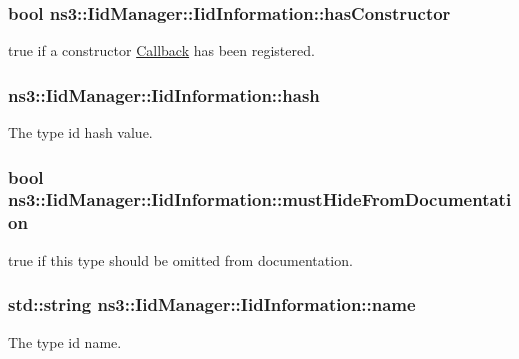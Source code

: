 \subsubsection[{\texorpdfstring{has\+Constructor}{hasConstructor}}]{\setlength{\rightskip}{0pt plus 5cm}bool ns3\+::\+Iid\+Manager\+::\+Iid\+Information\+::has\+Constructor}\hypertarget{structns3_1_1IidManager_1_1IidInformation_a9ee269731a2532bde60cf37ecac0ee18}{}\label{structns3_1_1IidManager_1_1IidInformation_a9ee269731a2532bde60cf37ecac0ee18}
{\ttfamily true} if a constructor \hyperlink{classns3_1_1Callback}{Callback} has been registered. 
\subsubsection[{\texorpdfstring{hash}{hash}}]{ ns3\+::\+Iid\+Manager\+::\+Iid\+Information\+::hash}\hypertarget{structns3_1_1IidManager_1_1IidInformation_abe6c59d16cffb91fc703d35a187eed1e}{}\label{structns3_1_1IidManager_1_1IidInformation_abe6c59d16cffb91fc703d35a187eed1e}
The type id hash value. 
\subsubsection[{\texorpdfstring{must\+Hide\+From\+Documentation}{mustHideFromDocumentation}}]{\setlength{\rightskip}{0pt plus 5cm}bool ns3\+::\+Iid\+Manager\+::\+Iid\+Information\+::must\+Hide\+From\+Documentation}\hypertarget{structns3_1_1IidManager_1_1IidInformation_aab1c6a5e3b78ce2fb5da67c24cb7106f}{}\label{structns3_1_1IidManager_1_1IidInformation_aab1c6a5e3b78ce2fb5da67c24cb7106f}
{\ttfamily true} if this type should be omitted from documentation. 
\subsubsection[{\texorpdfstring{name}{name}}]{\setlength{\rightskip}{0pt plus 5cm}std\+::string ns3\+::\+Iid\+Manager\+::\+Iid\+Information\+::name}\hypertarget{structns3_1_1IidManager_1_1IidInformation_a93b31c1c5e8326dffa684bbfc516f429}{}\label{structns3_1_1IidManager_1_1IidInformation_a93b31c1c5e8326dffa684bbfc516f429}
The type id name. 
